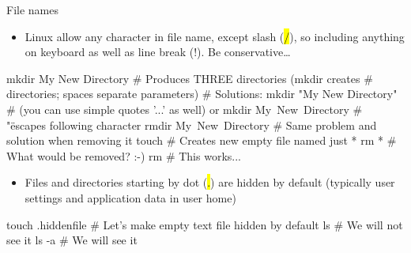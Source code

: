 \documentclass[compress, ucs, xelatex, 11pt, xcolor=svgnames,
  hyperref={
    bookmarks=true,
    unicode=true,
    colorlinks=true,
    pdftitle={Linux, command line and MetaCentrum},
    plainpages=false,
    pdfauthor={Vojtech Zeisek},
    pdfsubject={Course about use of Linux command line, writing shell scripts and using MetaCentrum of CESNET},
    pdfcreator={XeLaTeX},
    pdfkeywords={Linux, GNU, BASH, shell, command line, MetaCentrum},
    linkcolor=Red,
    anchorcolor=Blue,
    citecolor=Purple,
    filecolor=DodgerBlue,
    menucolor=DarkOrchid,
    urlcolor=DeepSkyBlue,
    pdftex},
  url={hyphens, lowtilde} %
  ]{beamer}
\renewcommand{\texttt}[1]{\hl{\ttfamily #1}}
\begin{document}
\begin{frame}[fragile]{File names}
\begin{itemize}
  \item Linux allow \alert{any} character in file name, except \alert{slash} (\texttt{/}), so including anything on keyboard as well as line break (!). Be conservative\ldots
\end{itemize}
  \begin{bashcode}
    mkdir My New Directory # Produces THREE directories (mkdir creates
                           # directories; spaces separate parameters)
                           # Solutions:
    mkdir "My New Directory" # (you can use simple quotes '...' as well) or
    mkdir My\ New\ Directory # "\" escapes following character
    rmdir My\ New\ Directory # Same problem and solution when removing it
    touch \* # Creates new empty file named just *
    rm * # What would be removed? :-)
    rm \* # This works...
  \end{bashcode}
\begin{itemize}
  \item Files and directories starting by \alert{dot} (\texttt{.}) are hidden by default (typically user settings and application data in user home)
\end{itemize}
  \begin{bashcode}
    touch .hiddenfile # Let's make empty text file hidden by default
    ls # We will not see it
    ls -a # We will see it
  \end{bashcode}
\end{frame}
\end{document}
